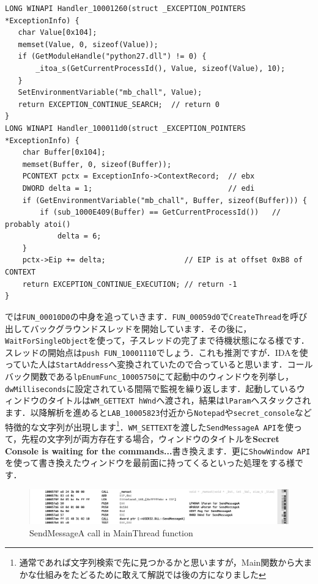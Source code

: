 \begin{tcolorbox}[title=例外ハンドラ箇所のclangっぽい書き方, sharp corners, left=2mm]\scriptsize
\begin{verbatim}
LONG WINAPI Handler_10001260(struct _EXCEPTION_POINTERS *ExceptionInfo) {
   char Value[0x104];
   memset(Value, 0, sizeof(Value));
   if (GetModuleHandle("python27.dll") != 0) {
       _itoa_s(GetCurrentProcessId(), Value, sizeof(Value), 10);
   }
   SetEnvironmentVariable("mb_chall", Value);
   return EXCEPTION_CONTINUE_SEARCH;  // return 0
}
LONG WINAPI Handler_100011d0(struct _EXCEPTION_POINTERS *ExceptionInfo) {
    char Buffer[0x104];
    memset(Buffer, 0, sizeof(Buffer));
    PCONTEXT pctx = ExceptionInfo->ContextRecord;  // ebx
    DWORD delta = 1;                               // edi
    if (GetEnvironmentVariable("mb_chall", Buffer, sizeof(Buffer))) {
        if (sub_1000E409(Buffer) == GetCurrentProcessId())   // probably atoi()
            delta = 6;
    }
    pctx->Eip += delta;                  // EIP is at offset 0xB8 of CONTEXT
    return EXCEPTION_CONTINUE_EXECUTION; // return -1
}
\end{verbatim}
\end{tcolorbox}
では\texttt{FUN\_00010D0}の中身を追っていきます．\texttt{FUN\_00059d0}で\texttt{CreateThread}を呼び出してバックグラウンドスレッドを開始しています．その後に，\texttt{WaitForSingleObject}を使って，子スレッドの完了まで待機状態になる様です．スレッドの開始点は\texttt{push FUN\_10001110}でしょう．これも推測ですが．IDAを使っていた人は\texttt{StartAddress}へ変換されていたので合っていると思います．コールバック関数である\texttt{lpEnumFunc\_10005750}にて起動中のウィンドウを列挙し，\texttt{dwMilliseconds}に設定されている間隔で監視を繰り返します．起動しているウィンドウのタイトルは\texttt{WM\_GETTEXT hWnd}へ渡され，結果は\texttt{lParam}へスタックされます．以降解析を進めると\texttt{LAB\_10005823}付近から\texttt{Notepad}や\texttt{secret\_console}など特徴的な文字列が出現します\footnote{通常であれば文字列検索で先に見つかるかと思いますが，Main関数から大まかな仕組みをたどるために敢えて解説では後の方になりました}．\texttt{WM\_SETTEXT}を渡した\texttt{SendMessageA API}を使って，先程の文字列が両方存在する場合，ウィンドウのタイトルを\textbf{Secret Console is waiting for the commands...}書き換えます．更に\texttt{ShowWindow API}を使って書き換えたウィンドウを最前面に持ってくるといった処理をする様です．
\begin{figure}[H]
    \centering
    \includegraphics[width=\linewidth]{./assets/takuzoo3868asset/ghidra_004_gray.png}
    \caption{SendMessageA call in MainThread function}
    \label{fig:ghdra_004}
\end{figure}
